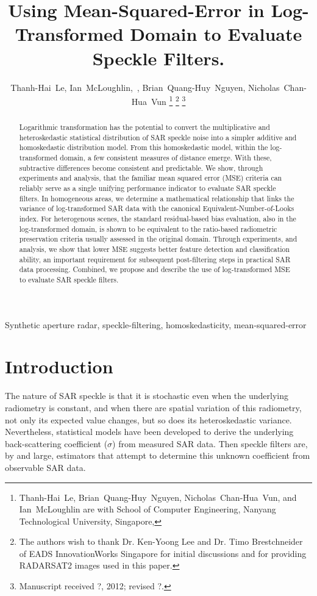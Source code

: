 \documentclass[journal]{IEEEtran}
\title{ 
	Using Mean-Squared-Error in Log-Transformed Domain to Evaluate Speckle Filters.
}
\author{Thanh-Hai~Le,
        Ian~McLoughlin,~\IEEEmembership{Senior Member,~IEEE}, 
	Brian~Quang-Huy~Nguyen,
	Nicholas~Chan-Hua~Vun%
\thanks{Thanh-Hai~Le, Brian~Quang-Huy~Nguyen, Nicholas~Chan-Hua~Vun, and Ian~McLoughlin are with School of Computer Engineering, 
Nanyang Technological University, Singapore,}%
\thanks{The authors wish to thank Dr. Ken-Yoong Lee and Dr. Timo Brestchneider of EADS InnovationWorks Singapore for initial discussions and for providing RADARSAT2 images used in this paper. }%
\thanks{Manuscript received ?, 2012; revised ?.}}
\begin{document}
\maketitle

\begin{abstract}

Logarithmic transformation has the potential to convert 
	the multiplicative and heteroskedastic statistical distribution of SAR speckle noise into 
	a simpler additive and homoskedastic distribution model.
From this homoskedastic model, within the log-transformed domain, 
	a few consistent measures of distance emerge.
With these, subtractive differences become consistent and predictable. 
We show, through experiments and analysis, that 
	the familiar mean squared error (MSE) criteria can reliably serve 
		as a single unifying performance indicator to evaluate SAR speckle filters. 
In homogeneous areas, we determine a mathematical relationship that links the variance of log-transformed SAR data with the canonical Equivalent-Number-of-Looks index.
For heterogenous scenes, the standard residual-based bias evaluation, also in the log-transformed domain, 
	is shown to be equivalent to the ratio-based radiometric preservation criteria usually assessed in the original domain. 
Through experiments, and analysis, we show that lower MSE suggests better feature detection and classification ability, an important requirement for subsequent post-filtering steps in practical SAR data processing.
Combined, we propose and describe the use of log-transformed MSE to evaluate SAR speckle filters.

\end{abstract}

\begin{IEEEkeywords}
Synthetic aperture radar, speckle-filtering, homoskedasticity, mean-squared-error
\end{IEEEkeywords}

\IEEEpeerreviewmaketitle

\section{Introduction}

The nature of SAR speckle is that
	it is stochastic even when the underlying radiometry is constant, 
	and when there are spatial variation of this radiometry, not only its expected value changes, but so does its heteroskedastic variance.
Nevertheless, statistical models have been developed to derive the underlying back-scattering coefficient ($\sigma$) from measured SAR data. 
Then speckle filters are, by and large, estimators that attempt to determine this unknown coefficient from observable SAR data. 
\end{document}
